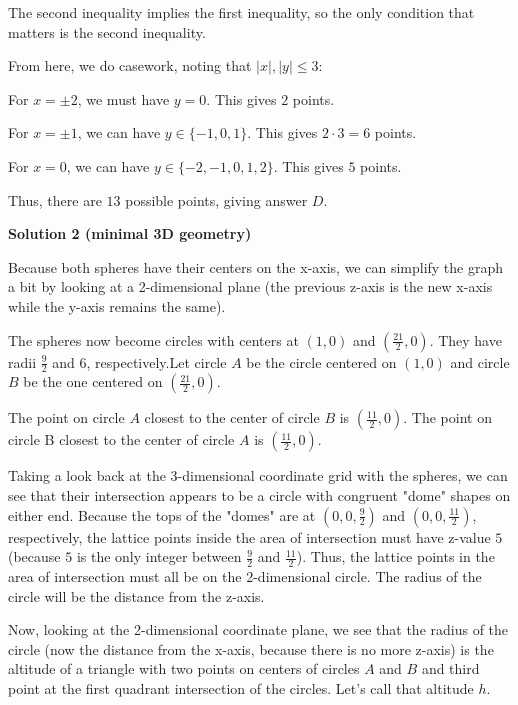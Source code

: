 \begin{enumerate}
 The second inequality implies the first inequality, so the only condition that matters is the second inequality.

 From here, we do casework, noting that $|x|, |y| \le 3$:

 For $x=\pm 2$, we must have $y=0$.  This gives $2$ points.

 For $x = \pm 1$, we can have $y\in \{-1, 0, 1\}$.  This gives $2\cdot 3 = 6$ points.

 For $x = 0$, we can have $y \in \{-2, -1, 0, 1, 2\}$.  This gives $5$ points.

 Thus, there are $\boxed{13}$ possible points, giving answer $\boxed{D}$.

 



\textbf{Solution 2 (minimal 3D geometry)}

Because both spheres have their centers on the x-axis, we can simplify the graph a bit by looking at a 2-dimensional plane (the previous z-axis is the new x-axis while the y-axis remains the same).

 The spheres now become circles with centers at $(1,0)$ and $(\frac{21}{2},0)$.  They have radii $\frac{9}{2}$ and $6$, respectively.Let circle $A$ be the circle centered on $(1,0)$ and circle $B$ be the one centered on $(\frac{21}{2},0)$.

 The point on circle $A$ closest to the center of circle $B$ is $(\frac{11}{2},0)$.  The point on circle B closest to the center of circle $A$ is $(\frac{11}{2},0)$.

 Taking a look back at the 3-dimensional coordinate grid with the spheres, we can see that their intersection appears to be a circle with congruent "dome" shapes on either end.  Because the tops of the "domes" are at $(0,0,\frac{9}{2})$ and $(0,0,\frac{11}{2})$, respectively, the lattice points inside the area of intersection must have z-value $5$ (because $5$ is the only integer between $\frac{9}{2}$ and $\frac{11}{2}$).  Thus, the lattice points in the area of intersection must all be on the 2-dimensional circle.  The radius of the circle will be the distance from the z-axis.

 Now, looking at the 2-dimensional coordinate plane, we see that the radius of the circle (now the distance from the x-axis, because there is no more z-axis) is the altitude of a triangle with two points on centers of circles $A$ and $B$ and third point at the first quadrant intersection of the circles.  Let's call that altitude $h$.


\end{enumerate}
